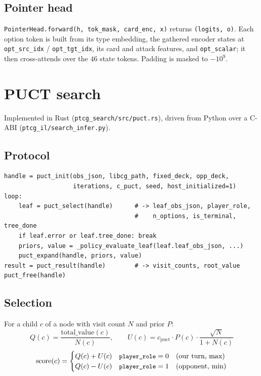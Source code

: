\documentclass[11pt,a4paper]{article}
\newcommand{\code}[1]{\texttt{\small #1}}
\newcommand{\file}[1]{\texttt{\small #1}}
\begin{document}
\subsection{Pointer head}

\code{PointerHead.forward(h, tok\_mask, card\_enc, x)} returns
\code{(logits, o)}. Each option token is built from its type embedding, the
gathered encoder states at \code{opt\_src\_idx} / \code{opt\_tgt\_idx}, its
card and attack features, and \code{opt\_scalar}; it then cross-attends over
the $46$ state tokens. Padding is masked to $-10^9$.

\section{PUCT search}
\label{sec:search}

Implemented in Rust (\file{ptcg\_search/src/puct.rs}), driven from Python over
a C-ABI (\file{ptcg\_il/search\_infer.py}).

\subsection{Protocol}

\begin{lstlisting}
handle = puct_init(obs_json, libcg_path, fixed_deck, opp_deck,
                   iterations, c_puct, seed, host_initialized=1)
loop:
    leaf = puct_select(handle)      # -> leaf_obs_json, player_role,
                                    #    n_options, is_terminal, tree_done
    if leaf.error or leaf.tree_done: break
    priors, value = _policy_evaluate_leaf(leaf.leaf_obs_json, ...)
    puct_expand(handle, priors, value)
result = puct_result(handle)        # -> visit_counts, root_value
puct_free(handle)
\end{lstlisting}

\subsection{Selection}

For a child $c$ of a node with visit count $N$ and prior $P$:
\begin{equation*}
Q(c) = \frac{\text{total\_value}(c)}{N(c)}, \qquad
U(c) = c_{\text{puct}} \cdot P(c) \cdot \frac{\sqrt{N}}{1 + N(c)}
\end{equation*}
\begin{equation*}
\text{score}(c) =
\begin{cases}
Q(c) + U(c) & \text{\code{player\_role}} = 0 \quad (\text{our turn, max}) \\
Q(c) - U(c) & \text{\code{player\_role}} = 1 \quad (\text{opponent, min})
\end{cases}
\end{equation*}
\end{document}
